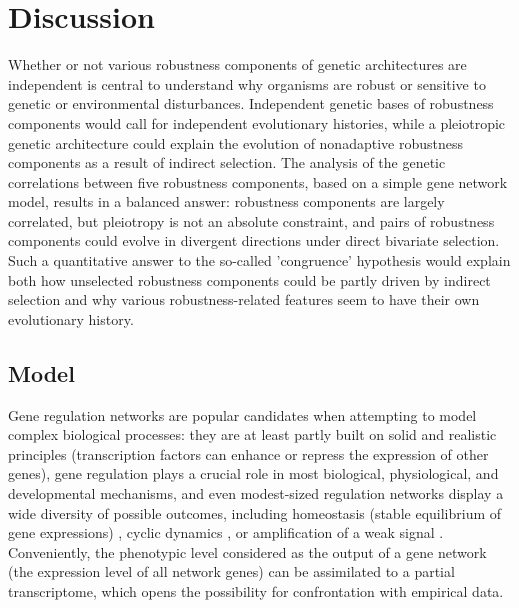 \documentclass[10pt,a4paper]{article}
\begin{document}
\section{Discussion}

Whether or not various robustness components of genetic architectures are independent is central to understand why organisms are robust or sensitive to genetic or environmental disturbances. Independent genetic bases of robustness components would call for independent evolutionary histories, while a pleiotropic genetic architecture could explain the evolution of nonadaptive robustness components as a result of indirect selection. The analysis of the genetic correlations between five robustness components, based on a simple gene network model, results in a balanced answer: robustness components are largely correlated, but pleiotropy is not an absolute constraint, and pairs of robustness components could evolve in divergent directions under direct bivariate selection. Such a quantitative answer to the so-called 'congruence' hypothesis \citep{dHW+03} would explain both how unselected robustness components could be partly driven by indirect selection and why various robustness-related features seem to have their own evolutionary history. 

\subsection{Model}

Gene regulation networks are popular candidates when attempting to model complex biological processes: they are at least partly built on solid and realistic principles (transcription factors can enhance or repress the expression of other genes), gene regulation plays a crucial role in most biological, physiological, and developmental mechanisms, and even modest-sized regulation networks display a wide diversity of possible outcomes, including homeostasis (stable equilibrium of gene expressions) \citep{Ste99}, cyclic dynamics \citep{LG03,ARB+10}, or amplification of a weak signal \citep{HB08}. Conveniently, the phenotypic level considered as the output of a gene network (the expression level of all network genes) can be assimilated to a partial transcriptome, which opens the possibility for confrontation with empirical data. 
\end{document}
